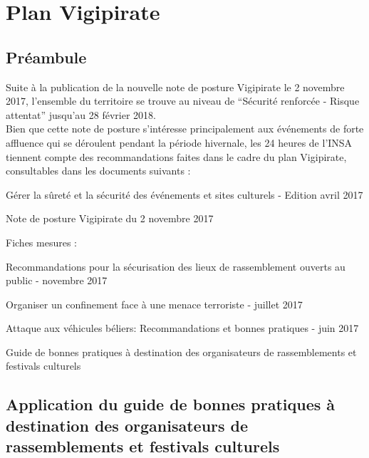 \documentclass[hidelinks, paper=a4, fontsize=13pt]{report}
\begin{document}

\newpage

\chapter{Plan Vigipirate}
\label{refVigipirate}

\section{Préambule}

Suite à la publication de la nouvelle note de posture Vigipirate le 2 novembre 2017, l'ensemble du territoire se trouve au niveau de “Sécurité renforcée - Risque attentat” jusqu'au 28 février 2018.\\

Bien que cette note de posture s'intéresse principalement aux événements de forte affluence qui se déroulent pendant la période hivernale, les 24 heures de l'INSA tiennent compte des recommandations faites dans le cadre du plan Vigipirate, consultables dans les documents suivants :
\begin{list}{•}{}
	\item Gérer la sûreté et la sécurité des événements et sites culturels - Edition avril 2017
	\item Note de posture Vigipirate du 2 novembre 2017
	\item Fiches mesures :
	\begin{list}{-}{}
		\item Recommandations pour la sécurisation des lieux de rassemblement ouverts au public - novembre 2017
		\item Organiser un confinement face à une menace terroriste - juillet 2017
		\item Attaque aux véhicules béliers: Recommandations et bonnes pratiques - juin 2017
	\end{list}
	\item Guide de bonnes pratiques à destination des organisateurs de rassemblements et festivals culturels
\end{list}


\section{Application du guide de bonnes pratiques à destination des organisateurs de rassemblements et festivals culturels}
\end{document}
